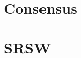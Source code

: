 \documentclass[11pt]{article}
\begin{document}
\maketitle

\section{}
\subsection{} 


\subsection{}


\subsection{}


\section{Consensus}

\section{SRSW}
\end{document}
